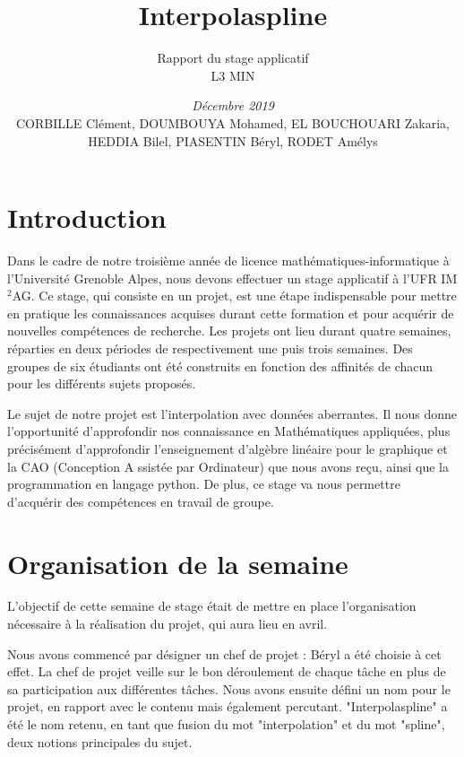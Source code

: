 \documentclass[a4paper,10pt]{article} %
\title{\textbf{Interpolaspline}}
\author{Rapport du stage applicatif\\ L3 MIN}
\date{\emph{Décembre 2019}\\CORBILLE Clément, DOUMBOUYA Mohamed, EL BOUCHOUARI Zakaria, HEDDIA Bilel, PIASENTIN Béryl, RODET Amélys}
\begin{document}

\maketitle %
\tableofcontents %

\newpage

\section*{Introduction}
Dans le cadre de notre troisième année de licence mathématiques-informatique à l’Université Grenoble Alpes, nous devons effectuer un stage applicatif à l’UFR IM$^2$AG. Ce stage, qui consiste en un projet, est une étape indispensable pour mettre en pratique les connaissances acquises durant cette formation et pour acquérir de nouvelles compétences de recherche. Les projets ont lieu durant quatre semaines, réparties en deux périodes de respectivement une puis trois semaines. Des groupes de six étudiants ont été construits en fonction des affinités de chacun pour les différents sujets proposés.

Le sujet de notre projet est l'interpolation avec données aberrantes. Il nous donne l’opportunité d’approfondir nos connaissance en Mathématiques appliquées, plus précisément d'approfondir l'enseignement d'algèbre linéaire pour le graphique et la CAO (Conception A ssistée par Ordinateur) que nous avons reçu, ainsi que la programmation en langage  python. De plus, ce stage va nous permettre d'acquérir des compétences en travail de groupe.

\section{Organisation de la semaine}

L'objectif de cette semaine de stage était de mettre en place l'organisation nécessaire à la réalisation du projet, qui aura lieu en avril.

Nous avons commencé par désigner un chef de projet : Béryl a été choisie à cet effet. La chef de projet veille sur le bon déroulement de chaque tâche en plus de sa participation aux différentes tâches. Nous avons ensuite défini un nom pour le projet, en rapport avec le contenu mais également percutant. "Interpolaspline" a été le nom retenu, en tant que fusion du mot "interpolation" et du mot "spline", deux notions principales du sujet.
\end{document}
